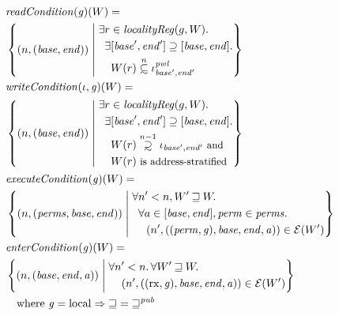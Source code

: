 \documentclass[compsoc,conference,letterpaper,fleqn]{IEEEtran}
\newcommand\subsetsim{\mathrel{\ooalign{\raise.2ex\hbox{$\subset$}\cr
      \hidewidth\lower.8ex\hbox{\scalebox{0.9}{$\sim$}}\hidewidth\cr}}}
\newcommand\supsetsim{\mathrel{\ooalign{\raise.2ex\hbox{$\supset$}\cr
      \hidewidth\lower.8ex\hbox{\scalebox{0.9}{$\sim$}}\hidewidth\cr}}}
\newcommand{\nsubsim}[1][n]{\stackrel{\tiny{#1}}{\subsetsim}}
\newcommand{\nsupsim}[1][n]{\stackrel{\tiny{#1}}{\supsetsim}}
\newcommand{\var}[1]{\mathit{#1}}
\newcommand{\gl}{\var{g}}
\newcommand{\addr}{\var{a}}
\newcommand{\start}{\var{base}}
\newcommand{\addrend}{\var{end}}
\newcommand{\perm}{\var{perm}}
\newcommand{\pwl}{\var{pwl}}
\newcommand{\plainfun}[2]{
  \ifthenelse{\equal{#2}{}}
  {\mathit{#1}}
  {\mathit{#1}(#2)}
}
\newcommand{\readCond}[1]{\plainfun{readCondition}{#1}}
\newcommand{\writeCond}[1]{\plainfun{writeCondition}{#1}}
\newcommand{\execCond}[1]{\plainfun{executeCondition}{#1}}
\newcommand{\entryCond}[1]{\plainfun{enterCondition}{#1}}
\newcommand{\future}{\mathbin{\sqsupseteq}}
\newcommand{\futurewk}{\mathbin{\sqsupseteq}^{\var{pub}}}
\newcommand{\asmType}{\plaindom{AsmType}}
\newcommand{\plaindom}[1]{\mathrm{#1}}
\newcommand{\intr}[2]{\mathcal{#1}}
\newcommand{\exprintr}[1]{\intr{E}{#1}}
\newcommand{\stder}{\exprintr{\asmType}}
\newcommand{\npair}[2][n]{\left(#1,#2 \right)}
\newcommand{\plainperm}[1]{\mathrm{#1}}
\newcommand{\exec}{\plainperm{rx}}
\newcommand{\local}{\plainperm{local}}
\begin{document}
{\begin{figure}[htbp]
  \centering
  \begin{align*}
  & \readCond{}(\gl)(W) =  \\
  & \left\{ \npair{(\start,\addrend)} \; \middle| \;
    \begin{aligned}
      & \exists r \in \var{localityReg}(g,W) \ldotp \\
      & \;\; \exists [\start',\addrend'] \supseteq [\start,\addrend] \ldotp \\
      & \;\;\;\; W(r)\nsubsim[n] \iota_{\start',\addrend'}^\pwl 
    \end{aligned} \right\}\\
  & \writeCond{}(\iota,\gl)(W) =  \\
  & \left\{ \npair{(\start,\addrend)} \; \middle| \;
    \begin{aligned}
      & \exists r \in \var{localityReg}(g,W) \ldotp \\
      & \;\; \exists [\start',\addrend'] \supseteq [\start,\addrend] \ldotp \\
      & \;\;\;\; W(r)\nsupsim[n-1] \iota_{\start',\addrend'} \text{\footnotesize{ and }}\\
      & \;\;\;\; W(r) \text{\footnotesize{ is address-stratified}} 
    \end{aligned} \right\}\\
  & \execCond{}(\gl)(W) = \\
  & \left\{ \npair{(\var{perms},\start,\addrend)} \; \middle| \;
    \begin{aligned}
      & \forall n' < n, W' \future W \ldotp \\
      & \;\; \forall a \in [\start,\addrend], \perm \in \var{perms} \ldotp \\
      & \;\;\;\; \npair[n']{((\perm,\gl),\start,\addrend,\addr)} \in \stder(W')\\
    \end{aligned} \right\} \\
  & \entryCond{}(\gl)(W) = \\
  & \left\{ \npair{(\start,\addrend,\addr)} \; \middle| \;
    \begin{aligned}
 &  \forall n' < n \ldotp \forall W' \future W \ldotp\\
      & \quad \npair[n']{((\exec,\gl),\start,\addrend,\addr)} \in \stder(W')
    \end{aligned} \right\} \\
  & \quad \text{where } \gl = \local \Rightarrow \future = \futurewk \\

\end{align*}
\end{figure}}
\end{document}
